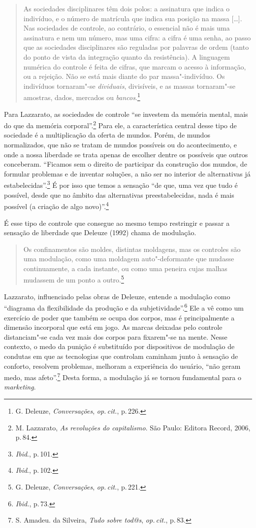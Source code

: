 \begin{quote}
As sociedades disciplinares têm dois polos: a assinatura que indica o
indivíduo, e o número de matrícula que indica sua posição na massa
{[}\ldots{}{]}. Nas sociedades de controle, ao contrário, o essencial não é mais
uma assinatura e nem um número, mas uma cifra: a cifra é uma senha, ao
passo que as sociedades disciplinares são reguladas por palavras de
ordem (tanto do ponto de vista da integração quanto da resistência). A
linguagem numérica do controle é feita de cifras, que marcam o acesso à
informação, ou a rejeição. Não se está mais diante do par
massa"-indivíduo. Os indivíduos tornaram"-se \textit{dividuais}, divisíveis, e
as massas tornaram"-se amostras, dados, mercados ou \textit{bancos}.\footnote{G. Deleuze, \textit{Conversações}, \textit{op.\,cit.}, p.\,226.}
\end{quote}

Para Lazzarato, as sociedades de controle ``se investem da memória mental, mais do que
da memória corporal''.\footnote{M. Lazzarato, \textit{As revoluções do capitalismo}. São Paulo: Editora Record, 2006, p.\,84.} Para ele, a característica central desse
tipo de sociedade é a multiplicação da oferta de mundos. Porém, de
mundos normalizados, que não se tratam de mundos possíveis ou do
acontecimento, e onde a nossa liberdade se trata apenas de escolher
dentre os possíveis que outros conceberam. ``Ficamos sem o direito de
participar da construção dos mundos, de formular problemas e de inventar
soluções, a não ser no interior de alternativas já estabelecidas''.\footnote{\textit{Ibid}., p.\,101.}
É por isso que temos a sensação ``de que, uma vez que tudo é possível, desde que no âmbito das alternativas preestabelecidas, nada é mais
possível (a criação de algo novo)''.\footnote{\textit{Ibid}., p.\,102.}

É esse tipo de controle que consegue ao mesmo tempo restringir e passar
a sensação de liberdade que Deleuze (1992) chama de modulação.

\begin{quote}
Os confinamentos são moldes, distintas moldagens, mas os controles são
uma modulação, como uma moldagem auto"-deformante que mudasse
continuamente, a cada instante, ou como uma peneira cujas malhas
mudassem de um ponto a outro.\footnote{G. Deleuze, \textit{Conversações}, \textit{op.\,cit.}, p.\,221.}
\end{quote}

Lazzarato, influenciado pelas obras de Deleuze, entende a
modulação como ``diagrama da flexibilidade da produção e da
subjetividade''.\footnote{\textit{Ibid.}, p.\,73.} Ele a vê como um exercício de poder que também se
ocupa dos corpos, mas é principalmente a dimensão incorporal que está em
jogo. As marcas deixadas pelo controle distanciam"-se cada vez mais dos
corpos para fixarem"-se na mente. Nesse contexto, o medo da punição é
substituído por dispositivos de modulação de condutas em que as
tecnologias que controlam caminham junto à sensação de conforto,
resolvem problemas, melhoram a experiência do usuário, ``não geram medo,
mas afeto''.\footnote{S. Amadeu. da Silveira, \textit{Tudo sobre tod@s}, \textit{op.\,cit.}, p.\,83.} Desta forma, a modulação já se tornou fundamental para o \textit{marketing}.

